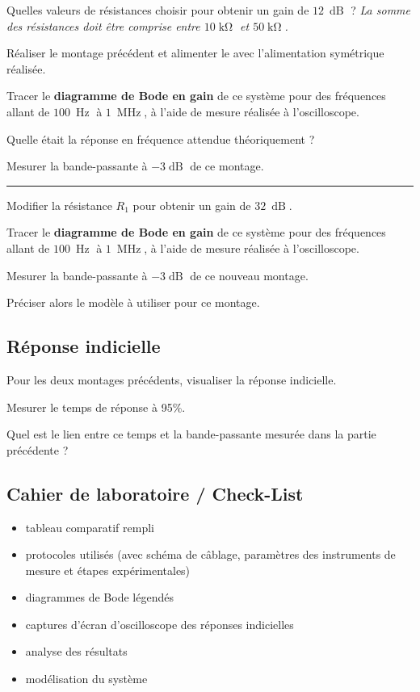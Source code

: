 \Quest Quelles valeurs de résistances choisir pour obtenir un gain de $12~\operatorname{dB}$ ? \textit{La somme des résistances doit être comprise entre $10\operatorname{k\Omega}$ et $50\operatorname{k\Omega}$.}

\Manip Réaliser le montage précédent et alimenter le avec l'alimentation symétrique réalisée.

\Manip Tracer le \textbf{diagramme de Bode en gain} de ce système pour des fréquences allant de $100~\operatorname{Hz}$ à $1~\operatorname{MHz}$, à l'aide de mesure réalisée à l'oscilloscope. 

\Quest Quelle était la réponse en fréquence attendue théoriquement ? 

\Manip Mesurer la bande-passante à $-3\operatorname{dB}$ de ce montage.

\noindent \rule{\linewidth}{1pt}

\Manip Modifier la résistance $R_1$ pour obtenir un gain de $32~\operatorname{dB}$.

\Manip Tracer le \textbf{diagramme de Bode en gain} de ce système pour des fréquences allant de $100~\operatorname{Hz}$ à $1~\operatorname{MHz}$, à l'aide de mesure réalisée à l'oscilloscope. 

\Manip Mesurer la bande-passante à $-3\operatorname{dB}$ de ce nouveau montage.

\Quest Préciser alors le modèle à utiliser pour ce montage. 


\subsection{Réponse indicielle}

\Manip Pour les deux montages précédents, visualiser la réponse indicielle.

\Manip Mesurer le temps de réponse à 95\%.

\Quest Quel est le lien entre ce temps et la bande-passante mesurée dans la partie précédente ?


\subsection{Cahier de laboratoire / Check-List}

\begin{itemize}[label=$\square$]
	\item tableau comparatif rempli
	\item protocoles utilisés (avec schéma de câblage, paramètres des instruments de mesure et étapes expérimentales)
	\item diagrammes de Bode légendés
	\item captures d'écran d'oscilloscope des réponses indicielles
	\item analyse des résultats
	\item modélisation du système
\end{itemize}




